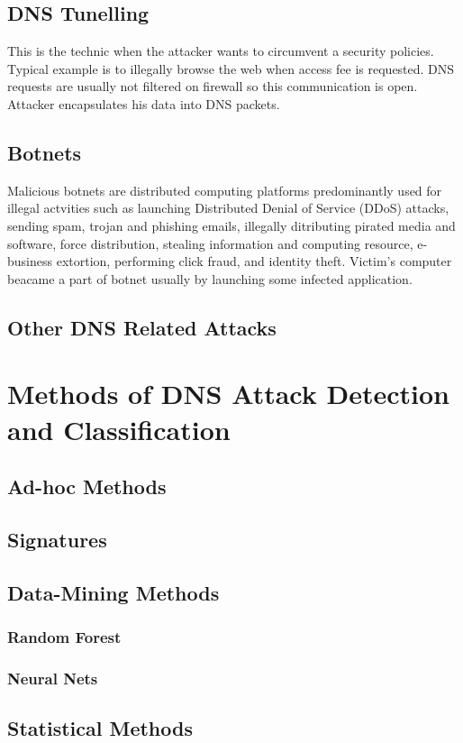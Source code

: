 \documentclass[thesis=M,english]{FITthesis}[2012/10/20]
\begin{document}
\section{DNS Tunelling}
This is the technic when the attacker wants to circumvent a security policies. Typical example is to illegally browse the web when access fee is requested. DNS requests are usually not filtered on firewall so this communication is open. Attacker encapsulates his data into DNS packets. \cite{EllZurSpe13}
\section{Botnets}
Malicious botnets are distributed computing platforms predominantly used for illegal actvities such as launching Distributed Denial of Service (DDoS) attacks, sending spam, trojan and phishing emails, illegally ditributing pirated media and software, force distribution, stealing information and computing resource, e-business extortion, performing click fraud, and identity theft. Victim's computer beacame a part of botnet usually by launching some infected application.\cite{FeiShaRam09}
\section{Other DNS Related Attacks}

\chapter{Methods of DNS Attack Detection and Classification}

\section{Ad-hoc Methods}
\section{Signatures}
\section{Data-Mining Methods}
\subsection{Random Forest}
\subsection{Neural Nets}
\section{Statistical Methods}
\end{document}
